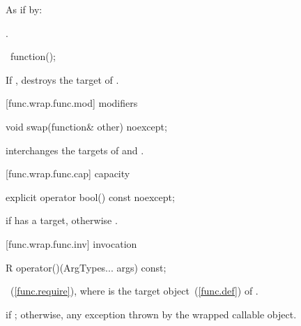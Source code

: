 \begin{itemdescr}
\pnum\effects As if by: 

\pnum
\returns {}.
\end{itemdescr}

%
\begin{itemdecl}
~function();
\end{itemdecl}

\begin{itemdescr}
\pnum\effects If , destroys the target of .
\end{itemdescr}

[func.wrap.func.mod]{ modifiers}

%
\begin{itemdecl}
void swap(function& other) noexcept;
\end{itemdecl}

\begin{itemdescr}
\pnum\effects interchanges the targets of  and .
\end{itemdescr}

[func.wrap.func.cap]{ capacity}

%
\begin{itemdecl}
explicit operator bool() const noexcept;
\end{itemdecl}

\begin{itemdescr}
\pnum
\returns {} if  has a target, otherwise .
\end{itemdescr}

[func.wrap.func.inv]{ invocation}

%
%
\begin{itemdecl}
R operator()(ArgTypes... args) const;
\end{itemdecl}

\begin{itemdescr}
\pnum
\returns {}~(\ref{func.require}),
where  is the target object~(\ref{func.def}) of .

\pnum\throws
{} if ; otherwise, any
exception thrown by the wrapped callable object.
\end{itemdescr}


